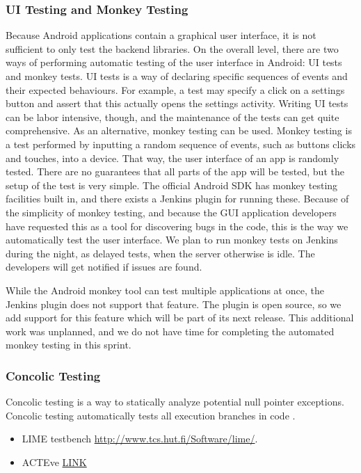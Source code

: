 \subsubsection{UI Testing and Monkey Testing}
Because Android applications contain a graphical user interface, it is not sufficient to only test the backend libraries. On the overall level, there are two ways of performing automatic testing of the user interface in Android: UI tests and monkey tests. UI tests is a way of declaring specific sequences of events and their expected behaviours. For example, a test may specify a click on a settings button and assert that this actually opens the settings activity. Writing UI tests can be labor intensive, though, and the maintenance of the tests can get quite comprehensive. As an alternative, monkey testing can be used. Monkey testing is a test performed by inputting a random sequence of events, such as buttons clicks and touches, into a device. That way, the user interface of an app is randomly tested. There are no guarantees that all parts of the app will be tested, but the setup of the test is very simple. The official Android SDK has monkey testing facilities built in, and there exists a Jenkins plugin for running these. Because of the simplicity of monkey testing, and because the GUI application developers have requested this as a tool for discovering bugs in the code, this is the way we automatically test the user interface. We plan to run monkey tests on Jenkins during the night, as delayed tests, when the server otherwise is idle. The developers will get notified if issues are found.

While the Android monkey tool can test multiple applications at once, the Jenkins plugin does not support that feature. The plugin is open source, so we add support for this feature which will be part of its next release. This additional work was unplanned, and we do not have time for completing the automated monkey testing in this sprint.

\subsubsection{Concolic Testing}
Concolic testing is a way to statically analyze potential null pointer exceptions. Concolic testing automatically tests all execution branches in code \parencite{concolic_testing_2015}.




\begin{itemize}
  \item LIME testbench \url{http://www.tcs.hut.fi/Software/lime/}.
  \item ACTEve \href{http://delivery.acm.org/10.1145/2400000/2393666/a59-anand.pdf?ip=130.225.198.195&id=2393666&acc=ACTIVE\%20SERVICE&key=36332CD97FA87885\%2E1DDFD8390336D738\%2E4D4702B0C3E38B35\%2E4D4702B0C3E38B35&CFID=627209490&CFTOKEN=76801213&__acm__=1424945812_ab641600a5058e5b199a617b521e4023}{LINK}
\end{itemize}

